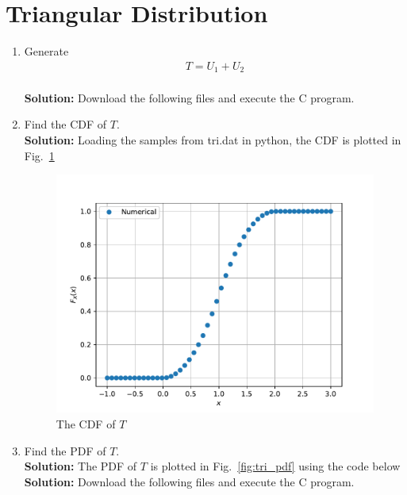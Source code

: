 \documentclass[12pt]{book}
\newcommand\figref{Fig.~\ref}
\newcommand{\solution}{\noindent \textbf{Solution: }}
\begin{document}
\section{Triangular Distribution}
\begin{enumerate}
\item Generate 
	\begin{align}
		T = U_1+U_2
	\end{align}\\
\solution Download the following files and execute the  C program.
\begin{center}
\end{center}
\item Find the CDF of $T$.\\
\solution Loading the samples from tri.dat in python, the CDF is plotted in \figref{fig:tri_cdf} 
\begin{figure}[H]
\centering
\includegraphics[width=\columnwidth]{./figs/2/2.4.2.pdf}
\caption{The CDF of $T$}
\label{fig:tri_cdf}
\end{figure}
\item Find the PDF of $T$.\\
\solution The PDF of $T$ is plotted in \figref{fig:tri_pdf} using the code below
\solution Download the following files and execute the  C program.
\begin{center}
\end{center}
\end{enumerate}
\end{document}
